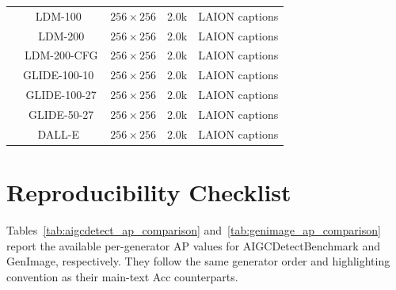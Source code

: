 \documentclass[lettersize,journal]{IEEEtran}
\begin{document}
\begin{table}[!htb]
\begin{tabular}{@{}c|cccc@{}}
& LDM-100~\cite{rombach2022ldm} & $256\times256$ & 2.0k & LAION captions \\
& LDM-200 & $256\times256$ & 2.0k & LAION captions \\
& LDM-200-CFG & $256\times256$ & 2.0k & LAION captions \\
& GLIDE-100-10~\cite{nichol2022glide} & $256\times256$ & 2.0k & LAION captions \\
& GLIDE-100-27 & $256\times256$ & 2.0k & LAION captions \\
& GLIDE-50-27 & $256\times256$ & 2.0k & LAION captions \\
& DALL-E~\cite{ramesh2021dalle} & $256\times256$ & 2.0k & LAION captions \\
\bottomrule
\end{tabular}
\end{table}

\clearpage
\section*{Reproducibility Checklist}

Tables~\ref{tab:aigcdetect_ap_comparison} and~\ref{tab:genimage_ap_comparison} report the available per-generator AP values for AIGCDetectBenchmark and GenImage, respectively. They follow the same generator order and highlighting convention as their main-text Acc counterparts.
\end{document}
